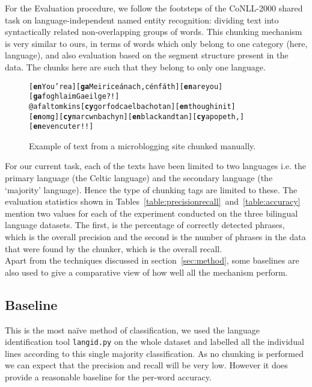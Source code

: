 \documentclass[11pt]{article}
\begin{document}
For the Evaluation procedure, we follow the footsteps of the CoNLL-2000 shared task on language-independent 
named entity recognition: dividing text into syntactically related non-overlapping groups of words. This 
chunking mechanism \cite{tjong2003introduction} is very similar to ours, in terms of words which only belong to 
one category (here, language), and also evaluation based on the segment structure present in the data. The chunks 
here are such that they belong to only one language. 

\begin{figure}
\begin{small}
\begin{alltt}
[\textbf{en} You're a] [\textbf{ga} Meirice\'{a}nach, c\'{e}n f\'{a}th] [\textbf{en} are you] [\textbf{ga} foghlaim Gaeilge?!] 
@afaltomkins [\textbf{cy} gorfod cael bach o tan] [\textbf{en} though init] 
[\textbf{en} omg] [\textbf{cy} mar cwn bach yn] [\textbf{en} black and tan] [\textbf{cy} a popeth,] [\textbf{en} even cuter!!] 
\end{alltt}
\end{small}
\caption{Example of text from a microblogging site chunked manually.}
\label{fig:tweets}
\end{figure}

For our current task, each of the texts have been limited to two languages i.e. the primary language (the Celtic language) and the 
secondary language (the `majority' language). Hence the type of chunking tags are limited to these. The evaluation statistics shown 
in Tables~\ref{table:precisionrecall}~and~\ref{table:accuracy} mention two values for each of the experiment conducted on the three bilingual 
language datasets. The first, is the percentage of correctly detected phrases, which is the overall precision and the second is the 
number of phrases in the data that were found by the chunker, which is the overall recall. \\

Apart from the techniques discussed in section~\ref{sec:method}, some baselines are also used to give a comparative view of how well all the mechanism perform.

\subsection{Baseline}
\label{baseline}

This is the most na\"{i}ve method of classification, we used the language identification tool \texttt{langid.py} \cite{lui2012langid} on the whole dataset and labelled all the individual lines according to this single majority classification. As no chunking is performed we can expect that the precision and recall will be very low. However it does provide a reasonable baseline for the per-word accuracy.  \\
\end{document}
